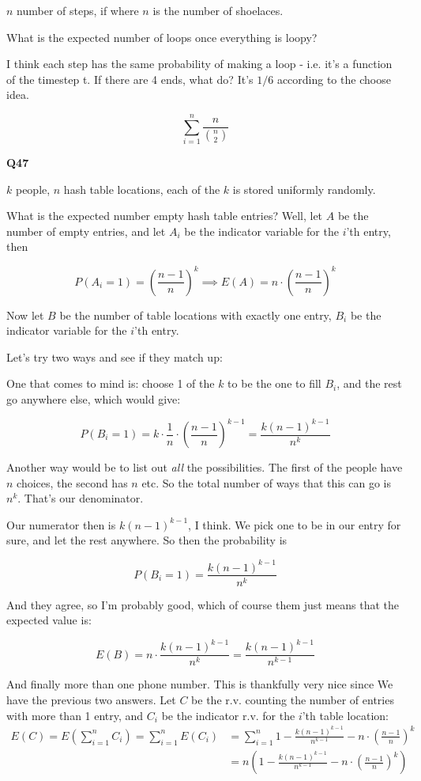\documentclass{article}
\begin{document}
		$n$ number of steps, if where $n$ is the number of shoelaces.
		
		What is the expected number of loops once everything is loopy?
		
		I think each step has the same probability of making a loop - i.e. it's a function of the timestep t. If there are 4 ends, what do?  It's $1/6$ according to the choose idea.  
		
		\[ \sum^{n}_{i=1} \frac{n}{{n \choose 2}} \]
		
		\textbf{Q47}
		
		$k$ people, $n$ hash table locations, each of the $k$ is stored uniformly randomly. 
		
		What is the expected number empty hash table entries? Well, let $A$ be the number of empty entries, and let $A_i$ be the indicator variable for the $i$'th entry, then 
		
		\[ P(A_i = 1) = \left(\frac{n-1}{n} \right)^k \implies E(A) = n\cdot \left(\frac{n-1}{n}\right)^k\]
		
		Now let $B$ be the number of table locations with exactly one entry, $B_i$ be the indicator variable for the $i$'th entry. 
		
		Let's try two ways and see if they match up:
		
		One that comes to mind is: choose 1 of the $k$ to be the one to fill $B_i$, and the rest go anywhere else, which would give:
		
		\[ P(B_i = 1) = k\cdot\frac{1}{n}\cdot\left(\frac{n-1}{n}\right)^{k-1} = \frac{k(n-1)^{k-1}}{n^k}\]
		
		Another way would be to list out \textit{all} the possibilities. The first of the people have $n$ choices, the second has $n$ etc. So the total number of ways that this can go is $n^k$. That's our denominator.
		
		Our numerator then is $k(n-1)^{k-1}$, I think. We pick one to be in our entry for sure, and let the rest anywhere. So then the probability is
		
		\[ P(B_i = 1) = \frac{k(n-1)^{k-1}}{n^k} \]
		
		And they agree, so I'm probably good, which of course them just means that the expected value is:
		
		\[ E(B) = n\cdot\frac{k(n-1)^{k-1}}{n^k} = \frac{k(n-1)^{k-1}}{n^{k-1}}\]
		
		And finally more than one phone number. This is thankfully very nice since We have the previous two answers. Let $C$ be the r.v. counting the number of entries with more than 1 entry, and $C_i$ be the indicator r.v. for the $i$'th table location:
		\begin{equation*}
			\begin{split}			
				E(C) = E\left(\sum^n_{i=1} C_i\right) = \sum^n_{i=1} E(C_i) &= \sum^n_{i=1} 1 - \frac{k(n-1)^{k-1}}{n^{k-1}} - n\cdot \left(\frac{n-1}{n}\right)^k \\
				&= n\left( 1 - \frac{k(n-1)^{k-1}}{n^{k-1}} - n\cdot \left(\frac{n-1}{n}\right)^k \right)
			\end{split}
		\end{equation*}
		
\end{document}
